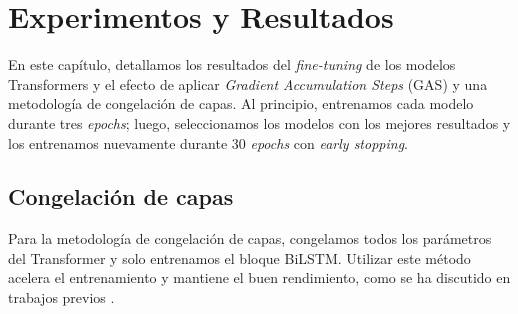 \chapter{Experimentos y Resultados}
\label{cap:resultados}




En este capítulo, detallamos los resultados del \textit{fine-tuning} de los modelos Transformers y el efecto de aplicar \textit{Gradient Accumulation Steps} (GAS)  y una metodología de congelación de capas. Al principio, entrenamos cada modelo durante tres \textit{epochs}; luego, seleccionamos los modelos con los mejores resultados y los entrenamos nuevamente durante 30 \textit{epochs} con \textit{early stopping}.

\section{Congelación de capas}

Para la metodología de congelación de capas, congelamos todos los parámetros del Transformer y solo entrenamos el bloque BiLSTM. Utilizar este método acelera el entrenamiento y mantiene el buen rendimiento, como se ha discutido en trabajos previos \citep{merchant2020happens,lee2019would,kovaleva2019revealing}.

